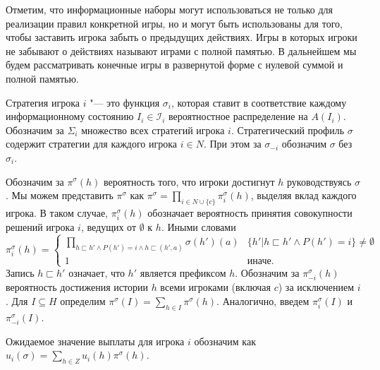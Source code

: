 \par
 Отметим, что информационные наборы могут использоваться не только для реализации правил конкретной игры, но и могут быть использованы для того, чтобы заставить игрока забыть о предыдущих действиях. Игры в которых игроки не забывают о действиях называют играми с полной памятью. В дальнейшем мы будем рассматривать конечные игры в развернутой форме с нулевой суммой и полной памятью.

Стратегия игрока $i$ "--- это функция $\sigma_i$, которая ставит в соответствие каждому информационному состоянию $I_i \in \mathcal{I}_i$ вероятностное распределение на $A(I_i)$. Обозначим за $\Sigma_i$ множество всех стратегий игрока $i$. Стратегический профиль $\sigma$ содержит стратегии для каждого игрока $i \in N$. При этом за $\sigma_{-i}$ обозначим $\sigma$ без $\sigma_i$. 

Обозначим за $\pi^\sigma(h)$ вероятность того, что игроки достигнут $h$ руководствуясь $\sigma$. Мы можем представить $\pi^\sigma$ как $\pi^\sigma = \prod_{i\in N\cup\{c\}}\pi_i^\sigma(h)$, выделяя вклад каждого игрока. В таком случае, $\pi_i^\sigma(h)$ обозначает вероятность принятия совокупности решений игрока $i$, ведущих от $\emptyset$ к $h$. Иными словами
\begin{equation*} 
\pi_i^\sigma(h)=
\begin{cases}
	\prod_{h \sqsubset h' \wedge P(h')=i \wedge h \sqsubset (h',a)} \sigma(h')(a) & \{h' | h \sqsubset h' \wedge P(h')=i \} \neq \emptyset\\
	1 &\text{иначе.}
\end{cases}
\end{equation*}
Запись $h \sqsubset h'$ означает, что $h'$ является префиксом $h$. 
Обозначим за $\pi_{-i}^\sigma(h) $ вероятность достижения истории $h$ всеми игроками (включая $c$) за исключением $i$.
Для $I \subseteq H $ определим $\pi^\sigma(I) = \sum_{h\in I}\pi^\sigma(h)$. Аналогично, введем $\pi_i^\sigma(I)$ и $\pi_{-i}^\sigma(I)$. 
\par
Ожидаемое значение выплаты для игрока $i$ обозначим как $u_i(\sigma)=\sum_{h\in Z}u_i(h)\pi^\sigma(h)$. 

